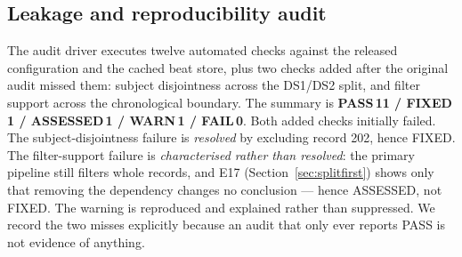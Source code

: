 \endgroup

\subsection{Leakage and reproducibility audit}

The audit driver executes twelve automated checks against the released
configuration and the cached beat store, plus two checks added after the original
audit missed them: subject disjointness across the DS1/DS2 split, and filter
support across the chronological boundary. The summary is
\textbf{PASS\,11 / FIXED\,1 / ASSESSED\,1 / WARN\,1 / FAIL\,0}. Both added checks
initially failed. The subject-disjointness failure is \emph{resolved} by excluding
record 202, hence FIXED. The filter-support failure is \emph{characterised rather
than resolved}: the primary pipeline still filters whole records, and E17
(Section~\ref{sec:splitfirst}) shows only that removing the dependency changes no
conclusion --- hence ASSESSED, not FIXED. The warning is reproduced and explained rather than suppressed. We record
the two misses explicitly because an audit that only ever reports PASS is not
evidence of anything.

